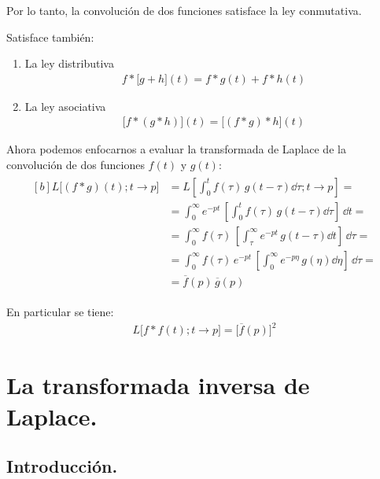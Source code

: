Por lo tanto, la convolución de dos funciones satisface la ley conmutativa.

Satisface también:
\begin{enumerate}
\item La ley distributiva
\begin{align}
f * \big[g + h\big](t) = f * g(t) + f * h(t)
\label{eq:ecuacion_03_57}
\end{align}
\item La ley asociativa
\begin{align}
\big[f * (g * h)\big](t) = \big[(f * g) * h\big](t)
\label{eq:ecuacion_03_58}
\end{align}
\end{enumerate}

Ahora podemos enfocarnos a evaluar la transformada de Laplace de la convolución de dos funciones $f(t)$ y $g(t)$:
\begin{align}
\begin{aligned}[b]
L \big[(f * g)(t); t \to p\big] &= L \left[ \int_{0}^{t} f(\tau) \, g(t - \tau) \dd{\tau}; t \to p \right] = \\[0.5em]
&= \int_{0}^{\infty} e^{-p t} \, \left[ \int_{0}^{t} f(\tau) \, g(t - \tau) \dd{\tau}\right] \, \dd{t} = \\[0.5em]
&= \int_{0}^{\infty} f(\tau) \, \left[ \int_{\tau}^{\infty} e^{-p t} \, g(t - \tau) \dd{t}\right] \, \dd{\tau} = \\[0.5em]
&= \int_{0}^{\infty} f(\tau) \, e^{- p t} \, \left[ \int_{0}^{\infty} e^{-p \eta} \, g(\eta) \dd{\eta} \right] \, \dd{\tau} = \\[0.5em]
&= \overline{f}(p) \, \overline{g}(p)
\end{aligned}
\label{eq:ecuacion_03_59}
\end{align}

En particular se tiene:
\begin{align*}
L \big[f * f(t); t \to p\big] = \big[\overline{f}(p)\big]^{2}
\end{align*}

\section{La transformada inversa de Laplace.}

\subsection{Introducción.}

